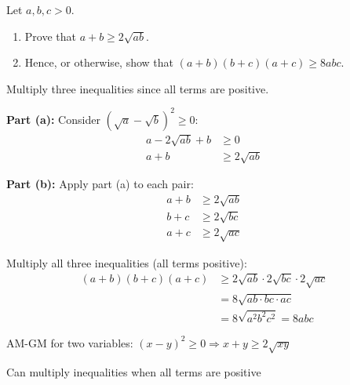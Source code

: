 \begin{problem}
Let $a, b, c > 0$. 
\begin{enumerate}
    \item[(a)] Prove that $a + b \ge 2\sqrt{ab}$.
    \item[(b)] Hence, or otherwise, show that $(a + b)(b + c)(a + c) \ge 8abc$.
\end{enumerate}
\end{problem}

\begin{hint}
Multiply three inequalities since all terms are positive.
\end{hint}

\begin{solution}
\textbf{Part (a):} Consider $(\sqrt{a} - \sqrt{b})^2 \geq 0$:
\begin{align*}
a - 2\sqrt{ab} + b &\geq 0 \\
a + b &\geq 2\sqrt{ab}
\end{align*}

\textbf{Part (b):} Apply part (a) to each pair:
\begin{align*}
a + b &\geq 2\sqrt{ab} \\
b + c &\geq 2\sqrt{bc} \\
a + c &\geq 2\sqrt{ac}
\end{align*}

Multiply all three inequalities (all terms positive):
\begin{align*}
(a + b)(b + c)(a + c) &\geq 2\sqrt{ab} \cdot 2\sqrt{bc} \cdot 2\sqrt{ac} \\
&= 8\sqrt{ab \cdot bc \cdot ac} \\
&= 8\sqrt{a^2b^2c^2} = 8abc
\end{align*}
\end{solution}

\begin{takeaways}
\item AM-GM for two variables: $(x-y)^2 \geq 0 \Rightarrow x + y \geq 2\sqrt{xy}$
\item Can multiply inequalities when all terms are positive
\end{takeaways}
